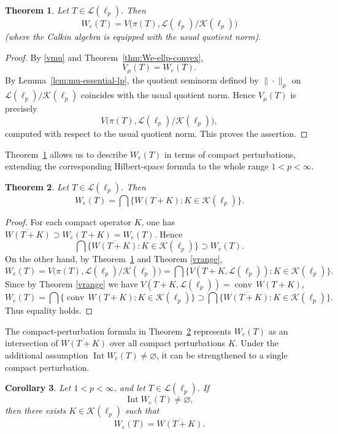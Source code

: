 \documentclass[11pt]{amsart}
\numberwithin{equation}{section}
\newtheorem{theorem}{Theorem}[section]
\newtheorem{corollary}[theorem]{Corollary}
\theoremstyle{definition}
\theoremstyle{remark}
\DeclareMathOperator{\conv}{conv}
\newcommand{\We}{W_e}
\begin{document}
\begin{theorem}\label{thm:We-ellp-calkin}
Let $T\in \mathcal L(\ell_p)$. Then
\[
        \We(T)
        =
        V\bigl(\pi(T),\mathcal L(\ell_p)/\mathcal K(\ell_p)\bigr)
\]
(where the Calkin algebra is equipped with the usual quotient norm).
\end{theorem}


\begin{proof}
By \eqref{vmu} and Theorem~\ref{thm:We-ellp-convex},
\[
        V_\mu(T)=\We(T).
\]
By Lemma~\ref{lem:mu-essential-lp}, the quotient seminorm defined by
\(\|\cdot\|_\mu\) on
\(\mathcal L(\ell_p)/\mathcal K(\ell_p)\) coincides with the usual quotient
norm. Hence \(V_\mu(T)\) is precisely
\[
        V\bigl(\pi(T),\mathcal L(\ell_p)/\mathcal K(\ell_p)\bigr),
\]
computed with respect to the usual quotient norm. This proves the assertion.
\end{proof}


Theorem~\ref{thm:We-ellp-calkin} allows us to describe $W_e(T)$ in terms of compact perturbations, extending the corresponding Hilbert-space formula to the whole range $1<p<\infty$.
\begin{theorem}\label{thm:We-ellp-compact-perturb}
Let $T\in \mathcal L(\ell_p)$. Then
\[
\We(T)=\bigcap\{\overline{W(T+K)}: K\in \mathcal K(\ell_p)\}.
\]
\end{theorem}

\begin{proof}
For each compact operator $K$, one has $\overline{W(T+K)}\supset \We(T+K)=\We(T)$. Hence
\[
\bigcap\{\overline{W(T+K)}: K\in \mathcal K(\ell_p)\}\supset \We(T).
\]
On the other hand, by Theorem~\ref{thm:We-ellp-calkin} and Theorem \ref{vrange},
\[
\We(T)=V\bigl(\pi(T),\mathcal L(\ell_p)/\mathcal K(\ell_p)\bigr)
=\bigcap\{V(T+K,\mathcal L(\ell_p)): K\in \mathcal K(\ell_p)\}.
\]
Since by Theorem \ref{vrange} we have $V(T+K,\mathcal L(\ell_p))=\overline{\conv}\, W(T+K)$, 
\[
\We(T)=\bigcap\{\overline{\conv}\, W(T+K): K\in \mathcal K(\ell_p)\}\supset \bigcap\{\overline{W(T+K)}: K\in \mathcal K(\ell_p)\}.
\]
Thus equality holds.
\end{proof}

The compact-perturbation formula in Theorem~\ref{thm:We-ellp-compact-perturb} represents \(\We(T)\) as an intersection of \(\overline{W(T+K)}\) over all compact perturbations \(K\). Under the additional assumption \(\operatorname{Int}\We(T)\ne\varnothing\), it can be strengthened to a single compact perturbation.

\begin{corollary}\label{cor:single-compact-realization}
Let \(1<p<\infty\), and let \(T\in\mathcal L(\ell_p)\). If
\[
        \operatorname{Int}\We(T)\ne\varnothing,
\]
then there exists \(K\in\mathcal K(\ell_p)\) such that
\[
        \We(T)=\overline{W(T+K)}.
\]
\end{corollary}
\end{document}
